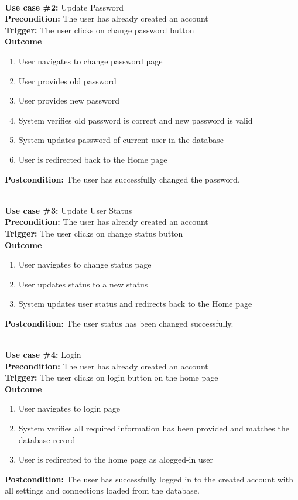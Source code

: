 \documentclass[12pt]{article}
\begin{document}
\noindent\\
\textbf{Use case \#2:} Update Password\\
\textbf{Precondition:} The user has already created an account\\
\textbf{Trigger:} The user clicks on change password button\\
\textbf{Outcome}
\begin{enumerate}
	\item User navigates to change password page
    \item User provides old password
    \item User provides new password
    \item System verifies old password is correct and new password is valid
    \item System updates password of current user in the database
    \item User is redirected back to the Home page
\end{enumerate}
\textbf{Postcondition:} The user has successfully changed the password.


\noindent\\
\textbf{Use case \#3:} Update User Status\\
\textbf{Precondition:} The user has already created an account\\
\textbf{Trigger:} The user clicks on change status button\\
\textbf{Outcome}
\begin{enumerate}
	\item User navigates to change status page
    \item User updates status to a new status
    \item System updates user status and redirects back to the Home page
\end{enumerate}
\textbf{Postcondition:} The user status has been changed successfully.


\noindent\\
\textbf{Use case \#4:} Login\\
\textbf{Precondition:} The user has already created an account\\
\textbf{Trigger:} The user clicks on login button on the home page\\
\textbf{Outcome}
\begin{enumerate}
	\item User navigates to login page
    \item System verifies all required information has been provided and matches the database record
    \item User is redirected to the home page as alogged-in user
\end{enumerate}
\textbf{Postcondition:} The user has successfully logged in to the created account with all settings and connections loaded from the database.
\end{document}
